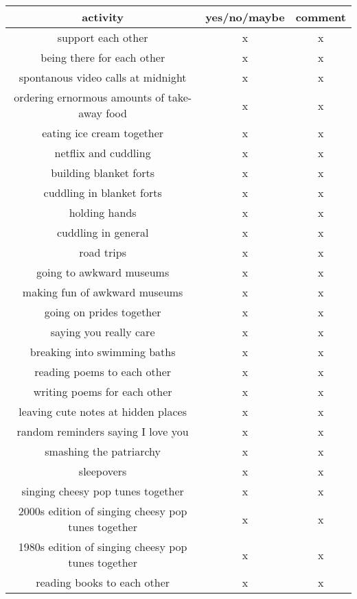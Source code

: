 \documentclass[a4paper]{article}
\begin{document}
\begin{table}[htb]
\begin{adjustbox}{width=1\textwidth}
	\begin{tabular}{@{}ccc@{}}
        \toprule
        activity &  yes/no/maybe &  comment \\
        \midrule
        support each other &  x &  x \\
        being there for each other &  x &  x \\
        spontanous video calls at midnight &  x &  x \\
        ordering ernormous amounts of take-away food &  x &  x \\
        eating ice cream together &  x &  x \\
        netflix and cuddling &  x &  x \\
        building blanket forts &  x &  x \\
        cuddling in blanket forts &  x &  x \\
        holding hands &  x &  x \\
        cuddling in general &  x &  x \\
        road trips &  x &  x \\
        going to awkward museums &  x &  x \\
        making fun of awkward museums &  x &  x \\
        going on prides together &  x &  x \\
        saying you really care &  x &  x \\
        breaking into swimming baths &  x &  x \\
        reading poems to each other &  x &  x \\
        writing poems for each other &  x &  x \\
        leaving cute notes at hidden places &  x &  x \\
        random reminders saying I love you &  x &  x \\
        smashing the patriarchy &  x &  x \\
        sleepovers &  x &  x \\
        singing cheesy pop tunes together &  x &  x \\
        2000s edition of singing cheesy pop tunes together &  x &  x \\
        1980s edition of singing cheesy pop tunes together &  x &  x \\
        reading books to each other &  x &  x \\

\end{tabular}
\end{adjustbox}
\end{table}
\end{document}
